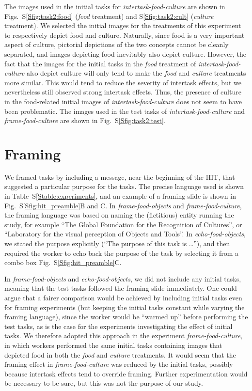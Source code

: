 \documentclass{pnastwo}
\begin{document}
\begin{article}
\begin{materials}
The images used in the initial tasks for \textit{intertask-food-culture} are
shown in Figs.~S\ref{Sfig:task2:food} (\textit{food} treatment) and
S\ref{Sfig:task2:cult} (\textit{culture} treatment).  We selected the initial
images for the treatments of this experiment to respectively depict
food and culture.  Naturally, since food is a very important aspect of culture,
pictorial depictions of the two concepts cannot be cleanly separated, and
images depicting food inevitably also depict culture.  However, the fact that
the images for the initial tasks in the \textit{food} treatment of
\textit{intertask-food-culture} also depict culture will only tend to make the
\textit{food} and \textit{culture} treatments more similar.  This would tend to
reduce the severity of intertask effects, but we nevertheless still observed
strong intertask effects.  Thus, the presence of culture in the food-related
initial images of \textit{intertask-food-culture} does not seem to have been
problematic.  The images used in the test tasks of
\textit{intertask-food-culture} and \textit{frame-food-culture} are shown in
Fig.~S\ref{Sfig:task2:test}.

\section{Framing} We framed tasks by including a message, near the beginning
of the HIT, that suggested a particular purpose for the tasks.  The precise
language used is shown in Table~S\ref{Stable:experiments}, and an example of a
framing slide is shown in Fig.~S\ref{Sfig:hit_preamble}B and C.  In
\textit{frame-food-objects} and \textit{frame-food-culture}, the framing
language was based on naming the (fictitious) entity running the study, for
example ``The Global Foundation for the Recognition of Cultures'', or
``Laboratory for the visual perception of Objects and Tools''.  In
\textit{echo-food-objects}, we stated the purpose explicitly (``The purpose of
this task is \dots''), and then required the worker to echo back the purpose of
the task by selecting it from a combo box Fig.~S\ref{Sfig:hit_preamble}C.

In \textit{frame-food-objects} and \textit{echo-food-objects}, we did not
include any initial tasks, meaning that the test tasks followed the framing
slide immediately.  One could argue that a fairer comparison would be achieved
by including initial tasks even for framing experiments (but keeping the
initial tasks constant while varying the framing language), since the worker
would be ``warmed up'' before performing the test tasks, as is the case for the
experiments investigating the effect of initial tasks.  We therefore adopted
this approach in the experiment \textit{frame-food-culture}, in which workers
performed the same initial tasks containing images that depicted food in both
the \textit{food} and \textit{culture} treatments.  It would seem that the
framing effect in \textit{frame-food-culture} was reduced by the initial tasks,
possibly because intertask effects tend to override framing. Further
experimentation would be necessary to be sure, but this was not the purpose of
our study.


\end{materials}
\end{article}
\end{document}
